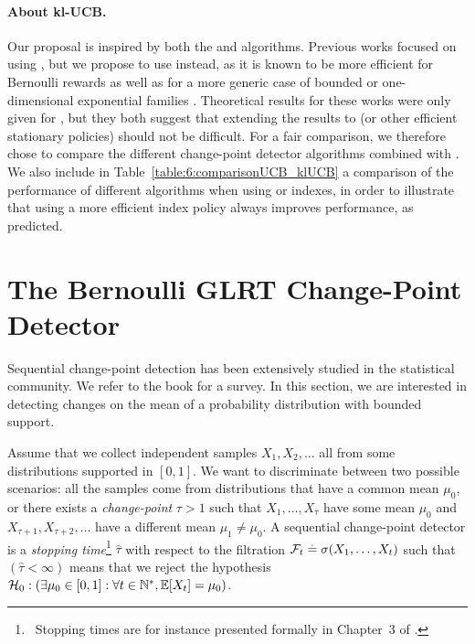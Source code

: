\paragraph{About kl-UCB.}
%
Our proposal \GLRklUCB{} is inspired by both the \MUCB{} and \CUSUMUCB{} algorithms.
Previous works focused on using \UCB{} \cite{LiuLeeShroff17,CaoZhenKvetonXie18},
but we propose to use \klUCB{} instead, as it is known to be more efficient for Bernoulli rewards as well as for a more generic case of bounded or one-dimensional exponential families \cite{KLUCBJournal}.
Theoretical results for these works were only given for \UCB, but they both suggest that extending the results to \klUCB{} (or other efficient stationary policies) should not be difficult.
For a fair comparison, we therefore chose to compare the different change-point detector algorithms combined with \klUCB.
We also include in Table~\ref{table:6:comparisonUCB_klUCB} a comparison of the performance of different algorithms when using \UCB{} or \klUCB{} indexes, in order to illustrate that using a more efficient index policy always improves performance, as predicted.


\section{The Bernoulli GLRT Change-Point Detector}
\label{sec:6:ChangePointDetector}

Sequential change-point detection has been extensively studied in the statistical community.
We refer to the book \cite{Basseville93} for a survey.
%
In this section, we are interested in detecting changes on the mean of a probability distribution with bounded support.

Assume that we collect independent samples $X_1,X_2,\dots$ all from some distributions supported in $[0,1]$.
We want to discriminate between two possible scenarios: all the samples come from distributions that have a common mean $\mu_0$, or there exists a \emph{change-point} $\tau > 1$ such that $X_1,\dots,X_\tau$ have some mean $\mu_0$ and $X_{\tau +1},X_{\tau+2},\dots$ have a different mean $\mu_1 \neq \mu_0$.
%
A sequential change-point detector is a \emph{stopping time}\footnote{~Stopping times are for instance presented formally in Chapter~3 of \cite{LattimoreBanditAlgorithmsBook}.} $\widehat{\tau}$ with respect to the filtration $\mathcal{F}_t \overset{.}{=} \sigma(X_1,\dots,X_t)$ such that $(\hat \tau < \infty)$ means that we reject the hypothesis
$\mathcal{H}_0 : \left(\exists \mu_0 \in [0,1]: \forall t\in\mathbb{N}^*, \mathbb{E}[X_t] = \mu_0\right)$.

